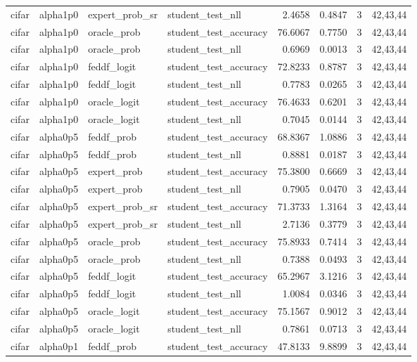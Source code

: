 \begin{tabular}{llllrrrl}
cifar & alpha1p0 & expert\_prob\_sr & student\_test\_nll & 2.4658 & 0.4847 & 3 & 42,43,44 \\
cifar & alpha1p0 & oracle\_prob & student\_test\_accuracy & 76.6067 & 0.7750 & 3 & 42,43,44 \\
cifar & alpha1p0 & oracle\_prob & student\_test\_nll & 0.6969 & 0.0013 & 3 & 42,43,44 \\
cifar & alpha1p0 & feddf\_logit & student\_test\_accuracy & 72.8233 & 0.8787 & 3 & 42,43,44 \\
cifar & alpha1p0 & feddf\_logit & student\_test\_nll & 0.7783 & 0.0265 & 3 & 42,43,44 \\
cifar & alpha1p0 & oracle\_logit & student\_test\_accuracy & 76.4633 & 0.6201 & 3 & 42,43,44 \\
cifar & alpha1p0 & oracle\_logit & student\_test\_nll & 0.7045 & 0.0144 & 3 & 42,43,44 \\
cifar & alpha0p5 & feddf\_prob & student\_test\_accuracy & 68.8367 & 1.0886 & 3 & 42,43,44 \\
cifar & alpha0p5 & feddf\_prob & student\_test\_nll & 0.8881 & 0.0187 & 3 & 42,43,44 \\
cifar & alpha0p5 & expert\_prob & student\_test\_accuracy & 75.3800 & 0.6669 & 3 & 42,43,44 \\
cifar & alpha0p5 & expert\_prob & student\_test\_nll & 0.7905 & 0.0470 & 3 & 42,43,44 \\
cifar & alpha0p5 & expert\_prob\_sr & student\_test\_accuracy & 71.3733 & 1.3164 & 3 & 42,43,44 \\
cifar & alpha0p5 & expert\_prob\_sr & student\_test\_nll & 2.7136 & 0.3779 & 3 & 42,43,44 \\
cifar & alpha0p5 & oracle\_prob & student\_test\_accuracy & 75.8933 & 0.7414 & 3 & 42,43,44 \\
cifar & alpha0p5 & oracle\_prob & student\_test\_nll & 0.7388 & 0.0493 & 3 & 42,43,44 \\
cifar & alpha0p5 & feddf\_logit & student\_test\_accuracy & 65.2967 & 3.1216 & 3 & 42,43,44 \\
cifar & alpha0p5 & feddf\_logit & student\_test\_nll & 1.0084 & 0.0346 & 3 & 42,43,44 \\
cifar & alpha0p5 & oracle\_logit & student\_test\_accuracy & 75.1567 & 0.9012 & 3 & 42,43,44 \\
cifar & alpha0p5 & oracle\_logit & student\_test\_nll & 0.7861 & 0.0713 & 3 & 42,43,44 \\
cifar & alpha0p1 & feddf\_prob & student\_test\_accuracy & 47.8133 & 9.8899 & 3 & 42,43,44 \\

\end{tabular}
